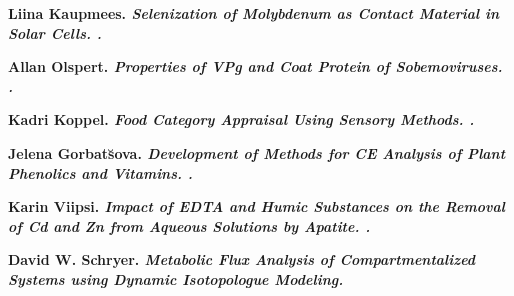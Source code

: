 \begin{list}
\item \bf Liina Kaupmees. \it Selenization of Molybdenum as Contact Material
  in Solar Cells. .

\item \bf Allan Olspert. \it Properties of VPg and Coat Protein of
  Sobemoviruses. .

\item \bf Kadri Koppel. \it Food Category Appraisal Using Sensory
  Methods. .

\item \bf Jelena Gorbat\u{s}ova. \it Development of Methods for CE Analysis of
  Plant Phenolics and Vitamins. .

\item \bf Karin Viipsi. \it Impact of EDTA and Humic Substances on the Removal
  of Cd and Zn from Aqueous Solutions by Apatite. .

\item \bf David W. Schryer. \it Metabolic Flux Analysis of Compartmentalized
  Systems using Dynamic Isotopologue Modeling. 

\end{list}
